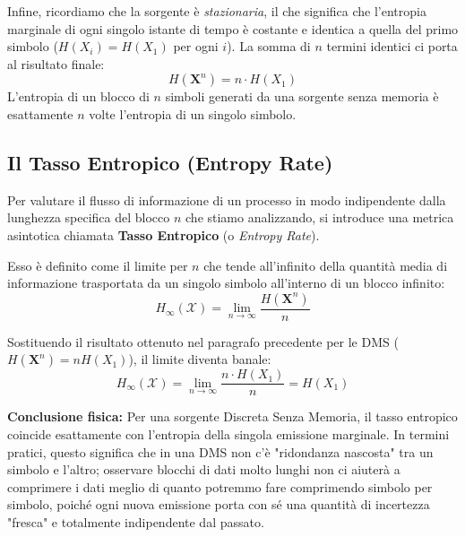 Infine, ricordiamo che la sorgente è \textit{stazionaria}, il che significa che l'entropia marginale di ogni singolo istante di tempo è costante e identica a quella del primo simbolo ($H(X_i) = H(X_1)$ per ogni $i$). La somma di $n$ termini identici ci porta al risultato finale:
\begin{equation}
    \boxed{ H(\mathbf{X}^n) = n \cdot H(X_1) }
\end{equation}
L'entropia di un blocco di $n$ simboli generati da una sorgente senza memoria è esattamente $n$ volte l'entropia di un singolo simbolo.

\subsection{Il Tasso Entropico (Entropy Rate)}

Per valutare il flusso di informazione di un processo in modo indipendente dalla lunghezza specifica del blocco $n$ che stiamo analizzando, si introduce una metrica asintotica chiamata \textbf{Tasso Entropico} (o \textit{Entropy Rate}). 

Esso è definito come il limite per $n$ che tende all'infinito della quantità media di informazione trasportata da un singolo simbolo all'interno di un blocco infinito:
\begin{equation}
    H_\infty(\mathcal{X}) = \lim_{n \to \infty} \frac{H(\mathbf{X}^n)}{n}
\end{equation}

Sostituendo il risultato ottenuto nel paragrafo precedente per le DMS ($H(\mathbf{X}^n) = n H(X_1)$), il limite diventa banale:
\begin{equation}
    H_\infty(\mathcal{X}) = \lim_{n \to \infty} \frac{n \cdot H(X_1)}{n} = H(X_1)
\end{equation}

\textbf{Conclusione fisica:} Per una sorgente Discreta Senza Memoria, il tasso entropico coincide esattamente con l'entropia della singola emissione marginale. In termini pratici, questo significa che in una DMS non c'è "ridondanza nascosta" tra un simbolo e l'altro; osservare blocchi di dati molto lunghi non ci aiuterà a comprimere i dati meglio di quanto potremmo fare comprimendo simbolo per simbolo, poiché ogni nuova emissione porta con sé una quantità di incertezza "fresca" e totalmente indipendente dal passato.



